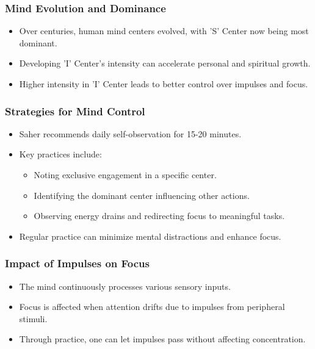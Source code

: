 \begin{frame}[fragile]\frametitle{Mind Evolution and Dominance}
    \begin{itemize}
        \item Over centuries, human mind centers evolved, with 'S' Center now being most dominant.
        \item Developing 'I' Center's intensity can accelerate personal and spiritual growth.
        \item Higher intensity in 'I' Center leads to better control over impulses and focus.
    \end{itemize}
\end{frame}

\begin{frame}[fragile]\frametitle{Strategies for Mind Control}
    \begin{itemize}
        \item Saher recommends daily self-observation for 15-20 minutes.
        \item Key practices include:
        \begin{itemize}
            \item Noting exclusive engagement in a specific center.
            \item Identifying the dominant center influencing other actions.
            \item Observing energy drains and redirecting focus to meaningful tasks.
        \end{itemize}
        \item Regular practice can minimize mental distractions and enhance focus.
    \end{itemize}
\end{frame}

\begin{frame}[fragile]\frametitle{Impact of Impulses on Focus}
    \begin{itemize}
        \item The mind continuously processes various sensory inputs.
        \item Focus is affected when attention drifts due to impulses from peripheral stimuli.
        \item Through practice, one can let impulses pass without affecting concentration.
    \end{itemize}
\end{frame}

